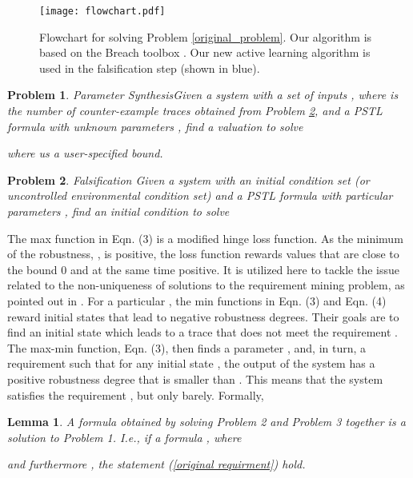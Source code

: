 \documentclass[10pt]{article}
\theoremstyle{plain}
\newtheorem{problem}{Problem}
\newtheorem{lemma}{Lemma}
\begin{document}
\begin{figure}[!htbp]
\label{fig:Requirement mining flowchart}
\centering
\texttt{[image: flowchart.pdf]}
\caption{Flowchart for solving Problem \ref{original_problem}. Our algorithm is based on the Breach toolbox \cite{donze2010breach,jin2013mining}. Our new active learning algorithm is used in the falsification step (shown in blue).}
\end{figure}

\begin{problem}
\label{ff:synthesis_problem}
\em Parameter Synthesis\em  Given a system  with a set of inputs , where  is the number of counter-example traces obtained from Problem \ref{falsificaton_problem}, and a PSTL formula  with unknown parameters , find a valuation  to solve 

where  us a user-specified bound.
\end{problem}

\begin{problem}
\label{falsificaton_problem}
\em Falsification\em  
Given a system  with an initial condition set (or uncontrolled environmental condition set)  and a PSTL formula  with particular parameters , find an initial condition  to solve

\end{problem}


The max function  in Eqn. (3) is a modified hinge loss function. As the minimum of the robustness, , is positive,  the loss function rewards values that are close to the bound 0 and at the same time positive. It is utilized here to tackle the issue related to the non-uniqueness of solutions to the requirement mining problem, as pointed out in \cite{jin2013mining}. For a particular , the min functions in Eqn. (3) and Eqn. (4) reward initial states that lead to negative robustness degrees. Their goals are to find an initial state which leads to a trace that does not meet the requirement . The max-min function, Eqn. (3), then finds a parameter , and, in turn, a requirement  such that for any initial state , the output of the system has a positive robustness degree that is smaller than . This means that the system satisfies the requirement , but only barely. Formally,

\begin{lemma}
\label{lemma problem}
A formula obtained by solving Problem 2 and Problem 3 together is a solution to Problem 1. I.e., if a formula , where 

and furthermore , the statement (\ref{original requirment}) hold.
\end{lemma}
\end{document}
